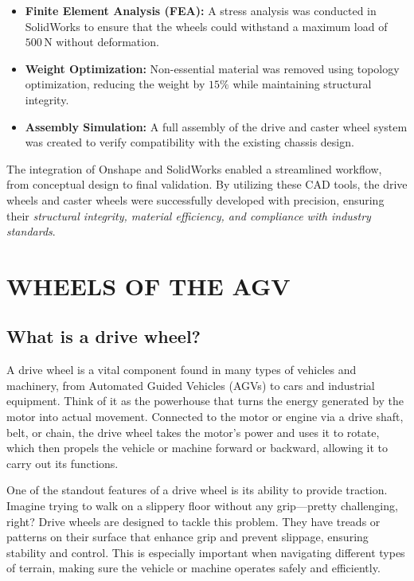 \documentclass[../../main]{subfiles}
\begin{document}
\begin{itemize}

\item \textbf{Finite Element Analysis (FEA):} A stress analysis was conducted in SolidWorks to ensure that the wheels could withstand a maximum load of $500 \, \mathrm{N}$ without deformation.

\item \textbf{Weight Optimization:} Non-essential material was removed using topology optimization, reducing the weight by $15\%$ while maintaining structural integrity.

\item \textbf{Assembly Simulation:} A full assembly of the drive and caster wheel system was created to verify compatibility with the existing chassis design.

\end{itemize}

The integration of Onshape and SolidWorks enabled a streamlined workflow, from conceptual design to final validation. By utilizing these CAD tools, the drive wheels and caster wheels were successfully developed with precision, ensuring their \emph{structural integrity, material efficiency, and compliance with industry standards}.

\section{WHEELS OF THE AGV }
\subsection{What is a drive wheel?}
A drive wheel is a vital component found in many types of vehicles and machinery, from Automated Guided Vehicles (AGVs) to cars and industrial equipment. Think of it as the powerhouse that turns the energy generated by the motor into actual movement. Connected to the motor or engine via a drive shaft, belt, or chain, the drive wheel takes the motor's power and uses it to rotate, which then propels the vehicle or machine forward or backward, allowing it to carry out its functions.

One of the standout features of a drive wheel is its ability to provide traction. Imagine trying to walk on a slippery floor without any grip—pretty challenging, right? Drive wheels are designed to tackle this problem. They have treads or patterns on their surface that enhance grip and prevent slippage, ensuring stability and control. This is especially important when navigating different types of terrain, making sure the vehicle or machine operates safely and efficiently.
\end{document}
